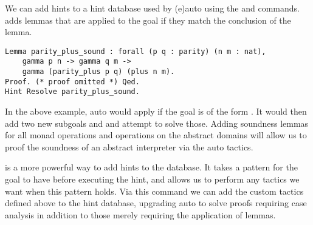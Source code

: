 We can add hints to a hint database used by (e)auto using the  and  commands.  adds lemmas
that are applied to the goal if they match the conclusion of the lemma. 

\begin{verbatim}
Lemma parity_plus_sound : forall (p q : parity) (n m : nat),
    gamma p n -> gamma q m -> 
    gamma (parity_plus p q) (plus n m).
Proof. (* proof omitted *) Qed.
Hint Resolve parity_plus_sound.
\end{verbatim}

In the above example, auto would apply  if the goal is of the 
form . It would then add two new
subgoals  and  and attempt to solve those. Adding
soundness lemmas for all monad operations and operations on the abstract
domains will allow us to proof the soundness of an abstract interpreter via the
auto tactics.

 is a more powerful way to add hints to the database. It
takes a pattern for the goal to have before executing the hint, and allows us
to perform any tactics we want when this pattern holds. Via this command we can
add the custom tactics defined above to the hint database, upgrading auto to
solve proofs requiring case analysis in addition to those merely requiring the
application of lemmas.
